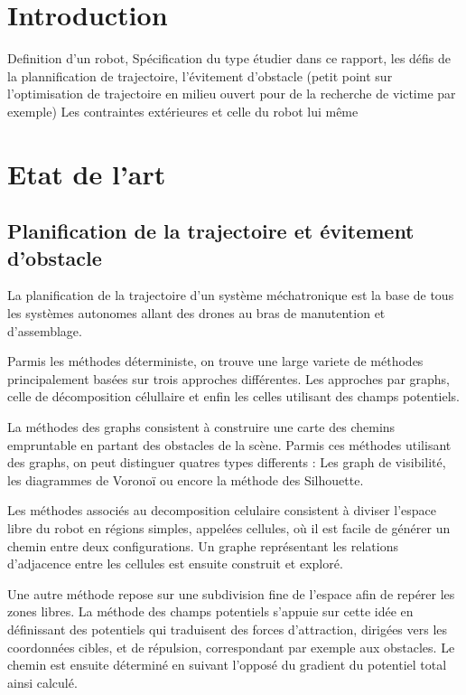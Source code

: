 \documentclass[main.tex]{subfiles}
\begin{document}
\section{Introduction}

Definition d'un robot,
Spécification du type étudier dans ce rapport,
les défis de la plannification de trajectoire,
l'évitement d'obstacle (petit point sur l'optimisation de trajectoire en milieu ouvert pour de la recherche de victime par exemple)
Les contraintes extérieures et celle du robot lui même

\newpage

\section{Etat de l'art}

\subsection{Planification de la trajectoire et évitement d'obstacle}

La planification de la trajectoire d'un système méchatronique est la base de tous les systèmes autonomes allant des drones au bras de manutention et d'assemblage.

Parmis les méthodes déterministe, on trouve une large variete de méthodes principalement basées sur trois approches différentes. Les approches par graphs, celle de décomposition célullaire et enfin les celles utilisant des champs potentiels.\cite{latombe_robot_1991}\cite{bhattacharyya_robot_2008}

La méthodes des graphs consistent à construire une carte des chemins empruntable en partant des obstacles de la scène. Parmis ces méthodes utilisant des graphs, on peut distinguer quatres types differents : Les graph de visibilité\cite{visibility_graph_1979}, les diagrammes de Voronoï \cite{garrido_path_2006} ou encore la méthode des Silhouette\cite{bhattacharyya_robot_2008}.

Les méthodes associés au decomposition celulaire consistent à diviser l'espace libre du robot en régions simples, appelées cellules, où il est facile de générer un chemin entre deux configurations. Un graphe représentant les relations d'adjacence entre les cellules est ensuite construit et exploré.\cite{latombe_robot_1991}\cite{zhu_new_1991}\cite{kedem_efficient_1990}\cite{avnaim_practical_1988}

Une autre méthode repose sur une subdivision fine de l'espace afin de repérer les zones libres. La méthode des champs potentiels s'appuie sur cette idée en définissant des potentiels qui traduisent des forces d'attraction, dirigées vers les coordonnées cibles, et de répulsion, correspondant par exemple aux obstacles. Le chemin est ensuite déterminé en suivant l'opposé du gradient du potentiel total ainsi calculé.\cite{latombe_robot_1991}\cite{koren_potential_1991}
\end{document}
